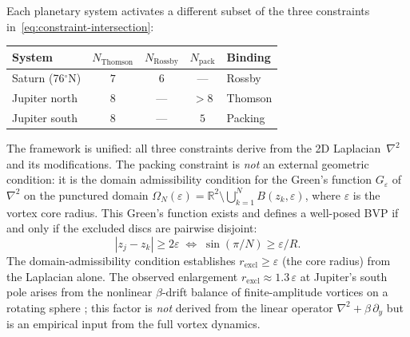 \begin{remark}
\label{rem:constraint-intersection}
Each planetary system activates a different subset of the three
constraints in~\eqref{eq:constraint-intersection}:
\begin{center}
\begin{tabular}{lcccl}
\toprule
System & $N_{\mathrm{Thomson}}$ & $N_{\mathrm{Rossby}}$ & $N_{\mathrm{pack}}$ & Binding \\
\midrule
Saturn (76${}^\circ$N)  & $7$ & $6$ & ---  & Rossby \\
Jupiter north           & $8$ & --- & $>8$ & Thomson \\
Jupiter south           & $8$ & --- & $5$  & Packing \\
\bottomrule
\end{tabular}
\end{center}
The framework is unified: all three constraints derive from the 2D
Laplacian~$\nabla^2$ and its modifications.  The packing constraint
is \emph{not} an external geometric condition: it is the domain
admissibility condition for the Green's function
$G_\varepsilon$ of~$\nabla^2$ on the punctured domain
$\Omega_N(\varepsilon) = \mathbb{R}^2 \setminus
\bigcup_{k=1}^N B(z_k, \varepsilon)$, where $\varepsilon$ is the
vortex core radius.  This Green's function exists and defines a
well-posed BVP if and only if the excluded discs are pairwise disjoint:
\[
  |z_j - z_k| \ge 2\varepsilon
  \;\Longleftrightarrow\;
  \sin(\pi/N) \ge \varepsilon/R.
\]
The domain-admissibility condition establishes
$r_{\mathrm{excl}} \ge \varepsilon$ (the core radius) from the
Laplacian alone.  The observed enlargement
$r_{\mathrm{excl}} \approx 1.3\,\varepsilon$ at Jupiter's south pole
arises from the nonlinear $\beta$-drift balance of finite-amplitude
vortices on a rotating sphere \citep{Gavriel2021}; this factor is
\emph{not} derived from the linear operator $\nabla^2 + \beta\,\partial_y$
but is an empirical input from the full vortex dynamics.


\end{remark}
